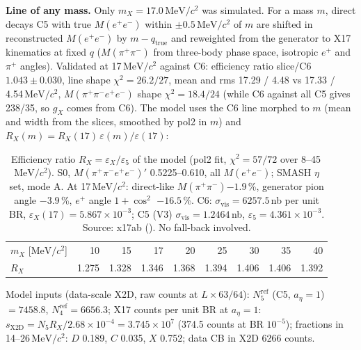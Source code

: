 \documentclass[11pt,a4paper]{article}
\newcommand{\Mfour}{\ensuremath{M(\pi^{+}\pi^{-}e^{+}e^{-})}\xspace}
\newcommand{\Mee}{\ensuremath{M(e^{+}e^{-})}\xspace}
\newcommand{\Mpipi}{\ensuremath{M(\pi^{+}\pi^{-})}\xspace}
\newcommand{\MeVcc}{\ensuremath{\mathrm{MeV}/c^{2}}\xspace}
\newcommand{\code}[1]{\texttt{\detokenize{#1}}}
\newcommand{\aEta}{\ensuremath{a_\eta}\xspace}
\begin{document}
\textbf{Line of any mass.} Only $m_X=17.0$\,\MeVcc was simulated. For a mass $m$, direct decays C5 with true \Mee within $\pm0.5$\,\MeVcc of $m$ are
shifted in reconstructed \Mee by $m-q_{\mathrm{true}}$ and reweighted from the generator to X17 kinematics at fixed $q$ (\Mpipi from three-body phase
space, isotropic $e^+$ and $\pi^+$ angles). Validated at 17\,\MeVcc against C6: efficiency ratio slice/C6 $1.043\pm0.030$, line shape $\chi^2=26.2/27$,
mean and rms 17.29 / 4.48 vs 17.33 / 4.54\,\MeVcc, \Mfour shape $\chi^2=18.4/24$ (while C6 against all C5 gives 238/35, so $g_X$ comes from C6). The
model uses the C6 line morphed to $m$ (mean and width from the slices, smoothed by pol2 in $m$) and $R_X(m)=R_X(17)\,\varepsilon(m)/\varepsilon(17)$:

\begin{table}[H]
\centering
\caption{Efficiency ratio $R_X=\varepsilon_X/\varepsilon_5$ of the model (pol2 fit, $\chi^2=57/72$ over 8--45\,\MeVcc). S0, \Mfour$'$ 0.5225--0.610, all
\Mee; SMASH $\eta$ set, mode A. At 17\,\MeVcc: direct-like \Mpipi $-1.9$\,\%, generator pion angle $-3.9$\,\%, $e^+$ angle $1+\cos^2$
$\mathbf{-16.5}$\,\%. C6: $\sigma_{\mathrm{vis}}=6257.5$\,nb per unit BR, $\varepsilon_X(17)=5.867\times10^{-3}$; C5 (V3) $\sigma_{\mathrm{vis}}=1.2464$\,nb,
$\varepsilon_5=4.361\times10^{-3}$. Source: x17ab (\code{x17ab_lines.txt}). No fall-back involved.}
\label{tab:RX}
\small
\begin{tabular}{@{}l r r r r r r r r@{}}
\toprule
$m_X$ [\MeVcc] & 10 & 15 & 17 & 20 & 25 & 30 & 35 & 40 \\
$R_X$ & 1.275 & 1.328 & 1.346 & 1.368 & 1.394 & 1.406 & 1.406 & 1.392 \\
\bottomrule
\end{tabular}
\end{table}

Model inputs (data-scale X2D, raw counts at $L\times63/64$): $N_5^{\mathrm{ref}}$ (C5, $\aEta=1$) $=7458.8$, $N_4^{\mathrm{ref}}=6656.3$; X17 counts per unit BR at
$\aEta=1$: $s_{\mathrm{X2D}}=N_5R_X/2.68\times10^{-4}=3.745\times10^7$ (374.5 counts at BR $10^{-5}$); fractions in 14--26\,\MeVcc: $D$ 0.189, $C$ 0.035,
$X$ 0.752; data CB in X2D 6266 counts.
\end{document}
